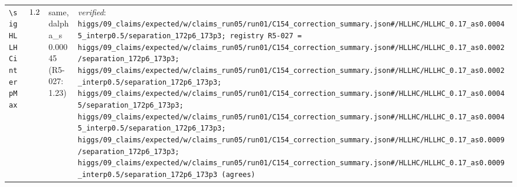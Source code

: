 {\begin{longtable}{@{}>{\raggedright\arraybackslash}p{}>{\raggedright\arraybackslash}p{}>{\raggedright\arraybackslash}p{}>{\raggedright\arraybackslash}p{}@{}}
\texttt{\textbackslash sigHLLHCinterpMax} & $1.2$ & same, dalpha\_\allowbreak{}s 0.00045 (R5-027: 1.23) & \emph{verified}: \texttt{higgs/\allowbreak{}09\_\allowbreak{}claims/\allowbreak{}expected/\allowbreak{}w/\allowbreak{}claims\_\allowbreak{}run05/\allowbreak{}run01/\allowbreak{}C154\_\allowbreak{}correction\_\allowbreak{}summary.json\#/\allowbreak{}HLLHC/\allowbreak{}HLLHC\_\allowbreak{}0.17\_\allowbreak{}as0.00045\_\allowbreak{}interp0.5/\allowbreak{}separation\_\allowbreak{}172p6\_\allowbreak{}173p3; registry R5-027 = higgs/\allowbreak{}09\_\allowbreak{}claims/\allowbreak{}expected/\allowbreak{}w/\allowbreak{}claims\_\allowbreak{}run05/\allowbreak{}run01/\allowbreak{}C154\_\allowbreak{}correction\_\allowbreak{}summary.json\#/\allowbreak{}HLLHC/\allowbreak{}HLLHC\_\allowbreak{}0.17\_\allowbreak{}as0.0002/\allowbreak{}separation\_\allowbreak{}172p6\_\allowbreak{}173p3; higgs/\allowbreak{}09\_\allowbreak{}claims/\allowbreak{}expected/\allowbreak{}w/\allowbreak{}claims\_\allowbreak{}run05/\allowbreak{}run01/\allowbreak{}C154\_\allowbreak{}correction\_\allowbreak{}summary.json\#/\allowbreak{}HLLHC/\allowbreak{}HLLHC\_\allowbreak{}0.17\_\allowbreak{}as0.0002\_\allowbreak{}interp0.5/\allowbreak{}separation\_\allowbreak{}172p6\_\allowbreak{}173p3; higgs/\allowbreak{}09\_\allowbreak{}claims/\allowbreak{}expected/\allowbreak{}w/\allowbreak{}claims\_\allowbreak{}run05/\allowbreak{}run01/\allowbreak{}C154\_\allowbreak{}correction\_\allowbreak{}summary.json\#/\allowbreak{}HLLHC/\allowbreak{}HLLHC\_\allowbreak{}0.17\_\allowbreak{}as0.00045/\allowbreak{}separation\_\allowbreak{}172p6\_\allowbreak{}173p3; higgs/\allowbreak{}09\_\allowbreak{}claims/\allowbreak{}expected/\allowbreak{}w/\allowbreak{}claims\_\allowbreak{}run05/\allowbreak{}run01/\allowbreak{}C154\_\allowbreak{}correction\_\allowbreak{}summary.json\#/\allowbreak{}HLLHC/\allowbreak{}HLLHC\_\allowbreak{}0.17\_\allowbreak{}as0.00045\_\allowbreak{}interp0.5/\allowbreak{}separation\_\allowbreak{}172p6\_\allowbreak{}173p3; higgs/\allowbreak{}09\_\allowbreak{}claims/\allowbreak{}expected/\allowbreak{}w/\allowbreak{}claims\_\allowbreak{}run05/\allowbreak{}run01/\allowbreak{}C154\_\allowbreak{}correction\_\allowbreak{}summary.json\#/\allowbreak{}HLLHC/\allowbreak{}HLLHC\_\allowbreak{}0.17\_\allowbreak{}as0.0009/\allowbreak{}separation\_\allowbreak{}172p6\_\allowbreak{}173p3; higgs/\allowbreak{}09\_\allowbreak{}claims/\allowbreak{}expected/\allowbreak{}w/\allowbreak{}claims\_\allowbreak{}run05/\allowbreak{}run01/\allowbreak{}C154\_\allowbreak{}correction\_\allowbreak{}summary.json\#/\allowbreak{}HLLHC/\allowbreak{}HLLHC\_\allowbreak{}0.17\_\allowbreak{}as0.0009\_\allowbreak{}interp0.5/\allowbreak{}separation\_\allowbreak{}172p6\_\allowbreak{}173p3 (agrees)} \\

\end{longtable}}
